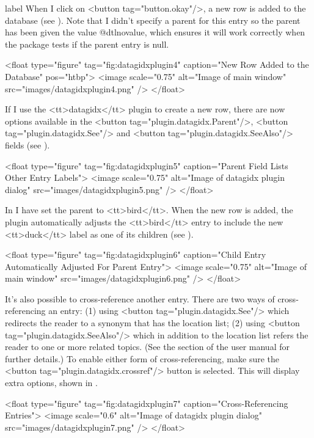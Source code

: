 \begin{example}{label}{}
   When I click on <button tag="button.okay"/>, a new row is
   added to the database (see ). Note that
   I didn't specify a parent for this entry so the parent has
   been given the value \gls{@dtlnovalue}, which ensures it will work
   correctly when the  package tests if the parent entry
   is null.

     <float type="figure" tag="fig:datagidxplugin4" caption="New Row Added to the Database" pos="htbp">
      <image scale="0.75" alt="Image of main window" src="images/datagidxplugin4.png" />
     </float>

   If I use the <tt>datagidx</tt> plugin to create a new row,
   there are now options available in the 
   <button tag="plugin.datagidx.Parent"/>, 
   <button tag="plugin.datagidx.See"/> and 
   <button tag="plugin.datagidx.SeeAlso"/> fields 
   (see ).

     <float type="figure" tag="fig:datagidxplugin5" caption="Parent Field Lists Other Entry Labels">
      <image scale="0.75" alt="Image of datagidx plugin dialog" src="images/datagidxplugin5.png" />
     </float>

   In  I have set the parent to 
   <tt>bird</tt>. When the new row is added, the plugin automatically adjusts
   the <tt>bird</tt> entry to include the new <tt>duck</tt> label as one of its
   children (see ).

     <float type="figure" tag="fig:datagidxplugin6" caption="Child Entry Automatically Adjusted For Parent Entry">
      <image scale="0.75" alt="Image of main window" src="images/datagidxplugin6.png" />
     </float>

   It's also possible to cross-reference another entry. There are two ways
   of cross-referencing an entry: (1) using <button tag="plugin.datagidx.See"/>
   which redirects the reader to a synonym that has the location list;
   (2) using <button tag="plugin.datagidx.SeeAlso"/> which in addition to the
   location list refers the reader to one or more related topics. (See the
    section of the  user manual
   for further details.) To enable
   either form of cross-referencing, make sure the
   <button tag="plugin.datagidx.crossref"/> button is selected. This will 
   display extra options, shown in .

     <float type="figure" tag="fig:datagidxplugin7" caption="Cross-Referencing Entries">
      <image scale="0.6" alt="Image of datagidx plugin dialog" src="images/datagidxplugin7.png" />
     </float>


\end{example}
